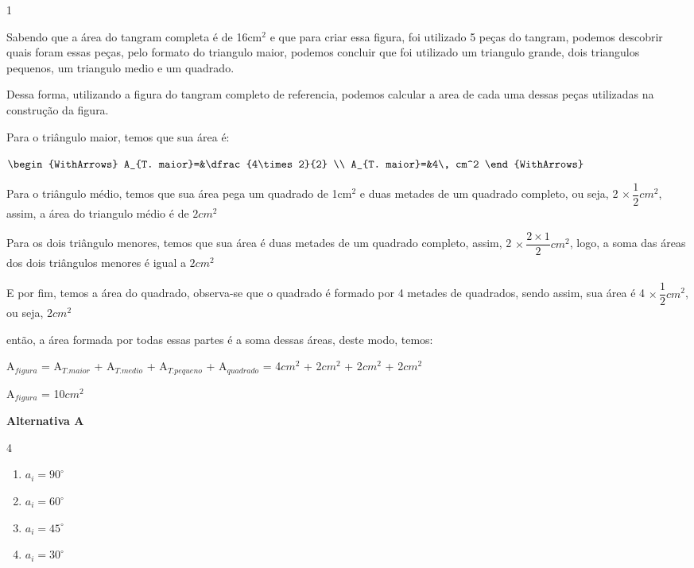 \begin{solucoes}{1}
    \solucao
    
Sabendo que a área do tangram completa é de 16cm$^2$ e que para criar essa figura, foi utilizado 5 peças do tangram, podemos descobrir quais foram essas peças, pelo formato do triangulo maior, podemos concluir que foi utilizado um triangulo grande, dois triangulos pequenos, um triangulo medio e um quadrado.

Dessa forma, utilizando a figura do tangram completo de referencia, podemos calcular a area de cada uma dessas peças utilizadas na construção da figura.

Para o triângulo maior, temos que sua área é:

$\begin{WithArrows}
    A_{T. maior}=&\dfrac{4\times2}{2} \\
    A_{T. maior}=&4\, cm^2
\end{WithArrows}$

Para o triângulo médio, temos que sua área pega um quadrado de 1cm$^2$ e duas metades de um quadrado completo, ou seja, 2 $\times\,\dfrac{1}{2}cm^2$, assim, a área do triangulo médio é de $2cm^2$

Para os dois triângulo menores, temos que sua área é duas metades de um quadrado completo, assim, 2 $\times\,\dfrac{2 \times 1}{2}cm^2$, logo, a soma das áreas dos dois triângulos menores é igual a $2cm^2$

E por fim, temos a área do quadrado, observa-se que o quadrado é formado por 4 metades de quadrados, sendo assim, sua área é 4 $\times\, \dfrac{1}{2}cm^2$, ou seja, 2$cm^2$

então, a área formada por todas essas partes é a soma dessas áreas, deste modo, temos:

A$_{figura}$ = A$_{T. maior}$ + A$_{T. medio}$ + A$_{T. pequeno}$ + A$_{quadrado}$ = 4$cm^2$ + 2$cm^2$ + 2$cm^2$ + 2$cm^2$ 

A$_{figura}$ = 10$cm^2$

\textbf{Alternativa A}
\end{solucoes}

        \begin{multicols}{4}
            \begin{enumerate}[label=\alph*)]
                \item $a_i=90^\circ$
                \item $a_i=60^\circ$
                \item $a_i=45^\circ$
                \item $a_i=30^\circ$
            \end{enumerate}
        \end{multicols}

